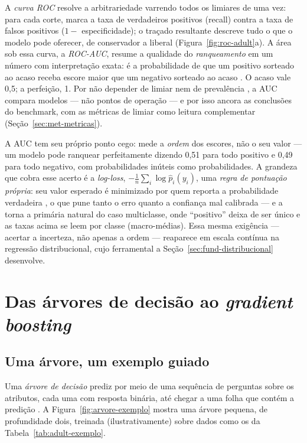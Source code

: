 A \emph{curva ROC} resolve a arbitrariedade varrendo todos os limiares de
uma vez: para cada corte, marca a taxa de verdadeiros positivos (recall)
contra a taxa de falsos positivos ($1-$ especificidade); o traçado
resultante descreve tudo o que o modelo pode oferecer, de conservador a
liberal (Figura~\ref{fig:roc-adult}a). A área sob essa curva, a
\emph{ROC-AUC}, resume a qualidade do \emph{ranqueamento} em um número com
interpretação exata: é a probabilidade de que um positivo sorteado ao
acaso receba escore maior que um negativo sorteado ao acaso
\citep{hanley1982}. O acaso vale 0,5; a perfeição, 1. Por não depender de
limiar nem de prevalência \citep{fawcett2006}, a AUC compara modelos ---
não pontos de operação --- e por isso ancora as conclusões do benchmark,
com as métricas de limiar como leitura complementar
(Seção~\ref{sec:met-metricas}).

A AUC tem seu próprio ponto cego: mede a \emph{ordem} dos escores, não o
seu valor --- um modelo pode ranquear perfeitamente dizendo 0,51 para
todo positivo e 0,49 para todo negativo, com probabilidades inúteis como
probabilidades. A grandeza que cobra esse acerto é a \emph{log-loss},
$-\frac{1}{n}\sum_i \log \hat p_i(y_i)$, uma \emph{regra de pontuação
própria}: seu valor esperado é minimizado por quem reporta a
probabilidade verdadeira \citep{gneiting2007}, o que pune tanto o erro
quanto a confiança mal calibrada --- e a torna a primária natural do caso
multiclasse, onde ``positivo'' deixa de ser único e as taxas acima se
leem por classe (macro-médias). Essa mesma exigência --- acertar a
incerteza, não apenas a ordem --- reaparece em escala contínua na
regressão distribucional, cujo ferramental a
Seção~\ref{sec:fund-distribucional} desenvolve.

\section{Das árvores de decisão ao \emph{gradient boosting}}
\label{sec:fund-gbdt}

\subsection{Uma árvore, um exemplo guiado}

Uma \emph{árvore de decisão} prediz por meio de uma sequência de perguntas
sobre os atributos, cada uma com resposta binária, até chegar a uma folha
que contém a predição \citep{cart1984}. A Figura~\ref{fig:arvore-exemplo} mostra uma árvore pequena,
de profundidade dois, treinada (ilustrativamente) sobre dados como os da
Tabela~\ref{tab:adult-exemplo}.

